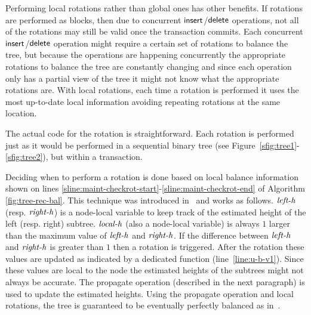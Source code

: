 Performing local rotations rather than global ones has other benefits.
If rotations are performed as blocks, then due to concurrent  $\act{insert}$/$\act{delete}$ operations, not all of the rotations may still be valid once the transaction commits.
Each concurrent $\act{insert}$/$\act{delete}$ operation might require a certain set of rotations to balance the tree,
but because the operations are happening concurrently the appropriate rotations to balance the tree are constantly changing
and since each operation only has a partial view of the tree it might not know what the appropriate rotations are.
With local rotations, each time a rotation is performed it uses the most up-to-date local information avoiding repeating rotations at the same location.

The actual code for the rotation is straightforward.
Each rotation is performed just as it would be performed in a sequential binary tree (see Figure~\ref{sfig:tree1}-\ref{sfig:tree2}), but within a transaction.

Deciding when to perform a rotation is done based on local balance information 
shown on lines \ref{sline:maint-checkrot-start}-\ref{sline:maint-checkrot-end} of Algorithm \ref{fig:tree-rec-bal}.
This technique was introduced in~\cite{IRISAppr} and works as follows.
$\ms{left-h}$ (resp. $\ms{right-h}$) is a node-local variable to keep track of the estimated height of the left (resp. right) subtree.
$\ms{local-h}$ (also a node-local variable) is always $1$ larger than the maximum value of $\ms{left-h}$ and $\ms{right-h}$.
If the difference between $\ms{left-h}$ and $\ms{right-h}$ is greater than $1$ then a rotation is triggered.
After the rotation these values are updated as indicated by a dedicated function (line~\ref{line:u-b-v1}).
Since these values are local to the node the estimated heights of the subtrees might not always be accurate.
The propagate operation (described in the next paragraph) is used to update the estimated heights.
Using the propagate operation and local rotations, the tree is guaranteed to be eventually perfectly balanced
as in~\cite{IRISAppr,BCCO10}.

